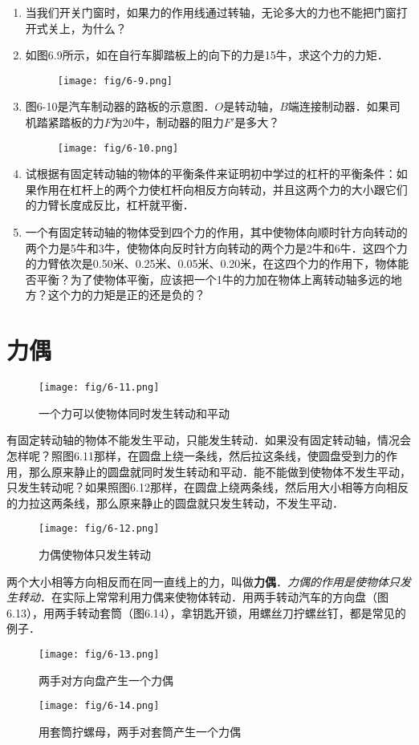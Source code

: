 \begin{enumerate}
    \item 当我们开关门窗时，如果力的作用线通过转轴，无论多大的力也不能把门窗打开式关上，为什么？
    \item 如图6.9所示，如在自行车脚踏板上的向下的力是15牛，求这个力的力矩．
\begin{figure}[htp]
\centering\texttt{[image: fig/6-9.png]}
\caption{}
\end{figure}
    \item 图6-10是汽车制动器的路板的示意图．$O$是转动轴，$B$端连接制动器．如果司机踏紧踏板的力$F$为20牛，制动器的阻力$F'$是多大？
\begin{figure}[htp]
\centering\texttt{[image: fig/6-10.png]}
\caption{}
\end{figure}
    \item 试根据有固定转动轴的物体的平衡条件来证明初中学过的杠杆的平衡条件：如果作用在杠杆上的两个力使杠杆向相反方向转动，并且这两个力的大小跟它们的力臂长度成反比，杠杆就平衡．
    \item 一个有固定转动轴的物体受到四个力的作用，其中使物体向顺时针方向转动的两个力是5牛和3牛，使物体向反时针方向转动的两个力是2牛和6牛．这四个力的力臂依次是0.50米、0.25米、0.05米、0.20米，在这四个力的作用下，物体能否平衡？为了使物体平衡，应该把一个1牛的力加在物体上离转动轴多远的地方？这个力的力矩是正的还是负的？
\end{enumerate}


\section{力偶}
\begin{figure}[htp]
\centering\texttt{[image: fig/6-11.png]}
\caption{一个力可以使物体同时发生转动和平动}
\end{figure}
有固定转动轴的物体不能发生平动，只能发生转动．如果没有固定转动轴，情况会怎样呢？照图6.11那样，在圆盘上绕一条线，然后拉这条线，使圆盘受到力的作用，那么原来静止的圆盘就同时发生转动和平动．能不能做到使物体不发生平动，只发生转动呢？如果照图6.12那样，在圆盘上绕两条线，然后用大小相等方向相反的力拉这两条线，那么原来静止的圆盘就只发生转动，不发生平动．

\begin{figure}[htp]
\centering\texttt{[image: fig/6-12.png]}
\caption{力偶使物体只发生转动}
\end{figure}

两个大小相等方向相反而在同一直线上的力，叫做\textbf{力偶}．\textit{力偶的作用是使物体只发生转动}．在实际上常常利用力偶来使物体转动．用两手转动汽车的方向盘（图6.13），用两手转动套筒（图6.14），拿钥匙开锁，用螺丝刀拧螺丝钉，都是常见的例子．
\begin{figure}[htp]
\centering\texttt{[image: fig/6-13.png]}
\caption{两手对方向盘产生一个力偶}
\end{figure}
\begin{figure}[htp]
\centering\texttt{[image: fig/6-14.png]}
\caption{用套筒拧螺母，两手对套筒产生一个力偶}
\end{figure}


